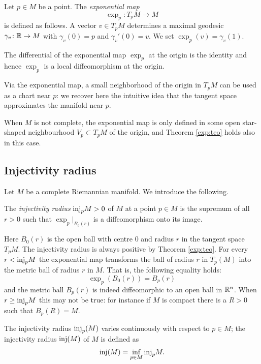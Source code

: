 \begin{defn}
Let $p \in M$ be a point. The \emph{exponential map}
$$\exp_p\colon T_pM \longrightarrow M$$
is defined as follows.
A vector $v\in T_pM$ determines a maximal geodesic $\gamma_v\colon \mathbb{R} \to M$ with $\gamma_v(0) = p$ and $\gamma_v'(0) = v$. We set $\exp_p(v) = \gamma_v(1)$.
\end{defn}

\begin{teo} \label{exp:teo}
The differential of the exponential map $\exp_p$ at the origin is the identity and hence $\exp_p$ is a local diffeomorphism at the origin.
\end{teo}

Via the exponential map, a small neighborhood of the origin in  $T_pM$ can be used as a chart near $p$: we recover here the intuitive idea that the tangent space approximates the manifold near $p$.

When $M$ is not complete, the exponential map is only defined in some open star-shaped neighbourhood $V_p \subset T_pM$ of the origin, and Theorem \ref{exp:teo} holds also in this case.

\subsection{Injectivity radius}
Let $M$ be a complete Riemannian manifold. We introduce the following.

\begin{defn} 
The \emph{injectivity radius} ${\rm inj}_pM>0$ of $M$ at a point $p\in M$ is the supremum of all $r>0$ such that $\exp_p|_{B_0(r)}$ is a diffeomorphism onto its image.
\end{defn}

Here $B_0(r)$ is the open ball with centre $0$ and radius $r$ in the tangent space $T_pM$. The injectivity radius is always positive by Theorem \ref{exp:teo}. For every $r< {\rm inj}_pM$ the exponential map transforms the ball of radius $r$ in $T_p(M)$ into the metric ball of radius $r$ in $M$. That is, the following equality holds: 
$$\exp_p(B_0(r)) = B_p(r)$$
and the metric ball $B_p(r)$ is indeed diffeomorphic to an open ball in $\mathbb{R}^n$. When $r\geq {\rm inj}_p M$ this may not be true: for instance if $M$ is compact there is a $R>0$ such that $B_p(R) = M$.

The injectivity radius ${\rm inj}_p(M)$ varies continuously with respect to $p\in M$; 
the injectivity radius ${\rm inj} (M)$ of $M$ is defined as
$${\rm inj} (M) = \inf_{p\in M} {\rm inj}_p M.$$

